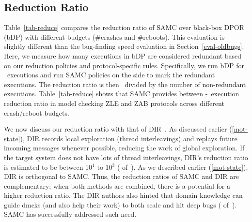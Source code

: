 

\subsection{Reduction Ratio}
\label{eval-reduce}


Table~\ref{tab-reduce} compares the reduction ratio of SAMC over
black-box DPOR (bDP) with different budgets (\#crashes and \#reboots).
This evaluation is slightly different than the bug-finding speed evaluation
in Section~\ref{eval-oldbugs}.  Here, we measure how many executions in bDP
are considered redundant based on our reduction policies and
protocol-specific rules.  Specifically, we run bDP for
\numRedRatioExecs\ executions and run SAMC policies on the side to mark the
redundant executions.  The reduction ratio is then
\numRedRatioExecs\ divided by the number of non-redundant executions.
Table~\ref{tab-reduce} shows that SAMC provides between
\numMinRedRatio-\numMaxRedRatio\ execution reduction ratio in model
checking ZLE and ZAB protocols across different crash/reboot budgets.


We now discuss our reduction ratio with that of DIR~\cite{Guo+11-Demeter}.
As discussed earlier (\sec\ref{mot-state}), DIR records local exploration
(thread interleavings) and replays future incoming messages whenever
possible, reducing the work of global exploration.  If the target system
does not have lots of thread interleavings, DIR's reduction ratio is
estimated to be between 10$^{1}$ to 10$^{3}$ (
of~\cite{Guo+11-Demeter}).  As we described earlier (\sec\ref{mot-state}),
DIR is orthogonal to SAMC.  Thus, the reduction ratios of SAMC and DIR are
complementary; when both methods are combined, there is a potential for a
higher reduction ratio.  The DIR authors also hinted that domain knowledge
can guide dmcks (and also help their work) to both scale and hit deep bugs
( of~\cite{Guo+11-Demeter}).  SAMC has successfully addressed such
need.




